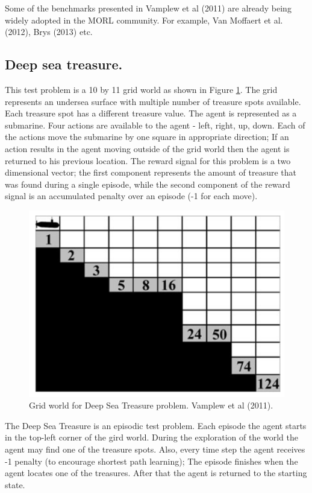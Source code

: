 Some of the benchmarks presented in Vamplew et al (2011)\nocite{vamplew2011empirical} are already being widely adopted in the MORL community. For example, Van Moffaert et al. (2012)\nocite{vamplew2011empirical}, Brys (2013)\nocite{brysmulti} etc.

\subsection{Deep sea treasure.}
\label{sec:deep-sea-treasure}
This test problem is a 10 by 11 grid world as shown in Figure \ref{fig:DSTOverview}. The grid represents an undersea surface with multiple number of treasure spots available. Each treasure spot has a different treasure value. The agent is represented as a submarine. Four actions are available to the agent - left, right, up, down. Each of the actions move the submarine by one square in appropriate direction; If an action results in the agent moving outside of the grid world then the agent is returned to his previous location. The reward signal for this problem is a two dimensional vector; the first component represents the amount of treasure that was found during a single episode, while the second component of the reward signal is an accumulated penalty over an episode (-1 for each move).

\begin{figure}[ht]
\vskip 0.2in
\centering
\includegraphics[scale=0.9]{dst.png}
\caption{Grid world for Deep Sea Treasure problem. Vamplew et al (2011).}
\label{fig:DSTOverview}
\end{figure}

The Deep Sea Treasure is an episodic test problem. Each episode the agent starts in the top-left corner of the gird world. During the exploration of the world the agent may find one of the treasure spots. Also, every time step the agent receives -1 penalty (to encourage shortest path learning); The episode finishes when the agent locates one of the treasures. After that the agent is returned to the starting state.

